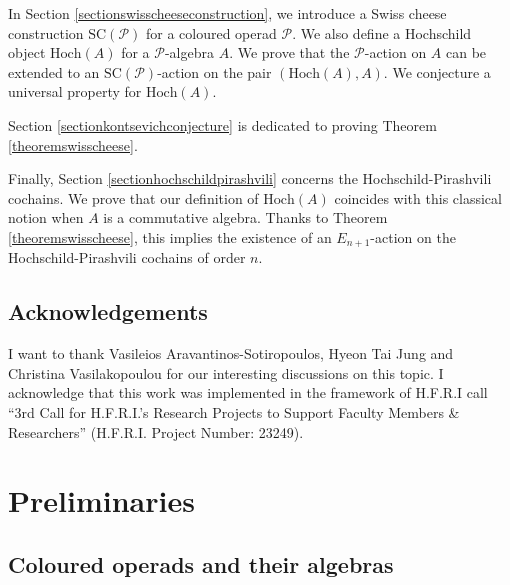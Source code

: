 \documentclass[]{amsart}
\theoremstyle{definition}
\begin{document}
In Section \ref{sectionswisscheeseconstruction}, we introduce a Swiss cheese construction $\mathrm{SC}(\mathcal{P})$ for a coloured operad $\mathcal{P}$. We also define a Hochschild object $\mathrm{Hoch}(A)$ for a $\mathcal{P}$-algebra $A$. We prove that the $\mathcal{P}$-action on $A$ can be extended to an $\mathrm{SC}(\mathcal{P})$-action on the pair $(\mathrm{Hoch}(A),A)$. We conjecture a universal property for $\mathrm{Hoch}(A)$.

Section \ref{sectionkontsevichconjecture} is dedicated to proving Theorem \ref{theoremswisscheese}.

Finally, Section \ref{sectionhochschildpirashvili} concerns the Hochschild-Pirashvili cochains. We prove that our definition of $\mathrm{Hoch}(A)$ coincides with this classical notion when $A$ is a commutative algebra. Thanks to Theorem \ref{theoremswisscheese}, this implies the existence of an $E_{n+1}$-action on the Hochschild-Pirashvili cochains of order $n$.



\subsection*{Acknowledgements}

I want to thank Vasileios Aravantinos-Sotiropoulos, Hyeon Tai Jung and Christina Vasilakopoulou for our interesting discussions on this topic. I acknowledge that this work was implemented in the framework of H.F.R.I call “3rd Call for H.F.R.I.’s Research Projects to
Support Faculty Members \& Researchers” (H.F.R.I. Project Number: 23249).

\section{Preliminaries}\label{sectionpreliminaries}



\subsection{Coloured operads and their algebras}\label{subsectioncolouredoperads}
\end{document}

